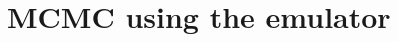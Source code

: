 \documentclass{article}
\begin{document}
%
%
%

%
%


\section{MCMC using the emulator}\label{MCMC}

\end{document}
